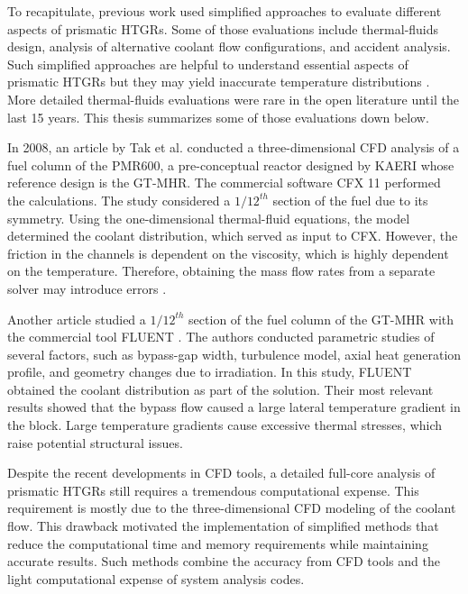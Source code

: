 To recapitulate, previous work used simplified approaches to evaluate different aspects of prismatic HTGRs.
Some of those evaluations include thermal-fluids design, analysis of alternative coolant flow configurations, and accident analysis.
Such simplified approaches are helpful to understand essential aspects of prismatic HTGRs but they may yield inaccurate temperature distributions \cite{tak_numerical_2008}.
More detailed thermal-fluids evaluations were rare in the open literature until the last 15 years.
This thesis summarizes some of those evaluations down below.

In 2008, an article by Tak et al. \cite{tak_numerical_2008} conducted a three-dimensional CFD analysis of a fuel column of the PMR600, a pre-conceptual reactor designed by \gls{KAERI} whose reference design is the GT-MHR.
The commercial software CFX 11 \cite{ansys_incorporated_cfx_2006} performed the calculations.
The study considered a $1/12^{th}$ section of the fuel due to its symmetry.
Using the one-dimensional thermal-fluid equations, the model determined the coolant distribution, which served as input to CFX.
However, the friction in the channels is dependent on the viscosity, which is highly dependent on the temperature.
Therefore, obtaining the mass flow rates from a separate solver may introduce errors \cite{sato_computational_2010}.

Another article \cite{sato_computational_2010} studied a $1/12^{th}$ section of the fuel column of the GT-MHR with the commercial tool FLUENT \cite{fluent_inc_fluent_2006}.
The authors conducted parametric studies of several factors, such as bypass-gap width, turbulence model, axial heat generation profile, and geometry changes due to irradiation.
In this study, FLUENT obtained the coolant distribution as part of the solution.
Their most relevant results showed that the bypass flow caused a large lateral temperature gradient in the block.
Large temperature gradients cause excessive thermal stresses, which raise potential structural issues.

Despite the recent developments in CFD tools, a detailed full-core analysis of prismatic HTGRs still requires a tremendous computational expense.
This requirement is mostly due to the three-dimensional CFD modeling of the coolant flow.
This drawback motivated the implementation of simplified methods that reduce the computational time and memory requirements while maintaining accurate results.
Such methods combine the accuracy from CFD tools and the light computational expense of system analysis codes.

